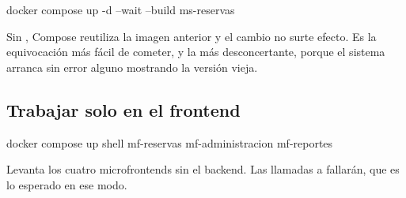 \begin{comando}
docker compose up -d --wait --build ms-reservas
\end{comando}

Sin , Compose reutiliza la imagen anterior y el cambio no surte
efecto. Es la equivocación más fácil de cometer, y la más desconcertante,
porque el sistema arranca sin error alguno mostrando la versión vieja.

\subsection{Trabajar solo en el frontend}

\begin{comando}
docker compose up shell mf-reservas mf-administracion mf-reportes
\end{comando}

Levanta los cuatro microfrontends sin el backend. Las llamadas a 
fallarán, que es lo esperado en ese modo.
